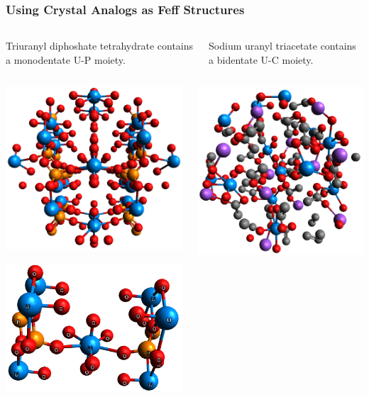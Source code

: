 \documentclass[10pt, xcolor=x11names, compress]{beamer}
\begin{document}
\begin{frame}
  \frametitle{Using Crystal Analogs as Feff Structures}
  \small
  \begin{columns}[T]
    \begin{column}{0.5\linewidth}
      Triuranyl diphoshate tetrahydrate contains a monodentate U-P moiety.
    \end{column}
    \begin{column}{0.5\linewidth}
      Sodium uranyl triacetate contains a bidentate U-C moiety.
    \end{column}
  \end{columns}

  \smallskip

  \begin{columns}[T]
    \begin{column}{0.5\linewidth}
      \begin{center}
        \includegraphics[width=0.4\linewidth]{mfc/upo4.png}

        \includegraphics[width=0.5\linewidth]{mfc/upo4_full.png}
      \end{center}
    \end{column}
    \begin{column}{0.5\linewidth}
      \begin{center}
        \includegraphics[width=0.4\linewidth]{mfc/NaU_triacetate_full.png}


\end{center}
\end{column}
\end{columns}
\end{frame}
\end{document}
